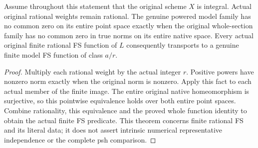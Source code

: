 \begin{theorem}
\label{thm:native-ample-model-finite-fs-transport}
\leanok
{}
Assume throughout this statement that the original scheme $X$ is integral.
Actual original rational weights remain rational. The genuine powered model
family has no common zero on its entire point space exactly when the original
whole-section family has no common zero in true norms on its entire native
space. Every actual original finite rational FS function of $L$ consequently
transports to a genuine finite model FS function of class $a/r$.
\end{theorem}
\begin{proof}
Multiply each rational weight by the actual integer $r$. Positive powers have
nonzero norm exactly when the original norm is nonzero. Apply this fact to each
actual member of the finite image. The entire original native homeomorphism
is surjective, so this pointwise equivalence holds over both entire point
spaces. Combine rationality, this equivalence and the proved whole function
identity to obtain the actual finite FS predicate. This theorem concerns
finite rational FS and its literal data; it does not assert intrinsic numerical
representative independence or the complete psh comparison.
\end{proof}
